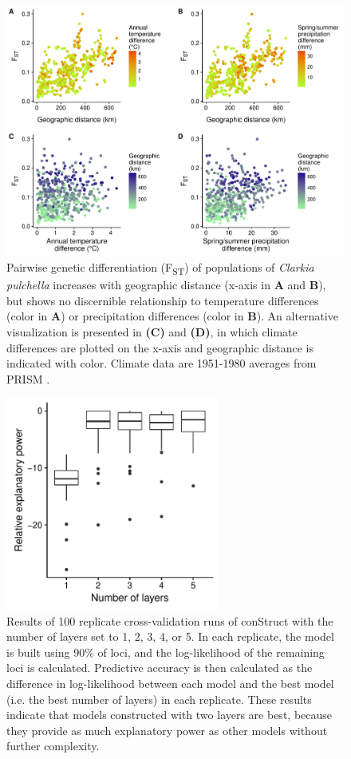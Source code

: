 \documentclass{article}
\begin{document}
\begin{figure}[p]
\centering
\includegraphics[width=\textwidth]{figs/fst_clim_dist.pdf}
\caption[Pairwise genetic differentiation vs. geographic distance]{Pairwise genetic differentiation (F\textsubscript{ST}) of populations of \textit{Clarkia pulchella} increases with geographic distance (x-axis in \textbf{A} and \textbf{B}), but shows no discernible relationship to temperature differences (color in \textbf{A}) or precipitation differences (color in \textbf{B}). An alternative visualization is presented in \textbf{(C)} and \textbf{(D)}, in which climate differences are plotted on the x-axis and geographic distance is indicated with color. Climate data are 1951-1980 averages from PRISM \citep{PRISM}.}
\label{fst_main_popgen}
\end{figure}

\begin{figure}[p]
\centering
\includegraphics[width=7cm]{figs/xval_results.pdf}
\caption[Results of conStruct cross validation]{Results of 100 replicate cross-validation runs of conStruct with the number of layers set to 1, 2, 3, 4, or 5. In each replicate, the model is built using 90\% of loci, and the log-likelihood of the remaining loci is calculated. Predictive accuracy is then calculated as the difference in log-likelihood between each model and the best model (i.e. the best number of layers) in each replicate. These results indicate that models constructed with two layers are best, because they provide as much explanatory power as other models without further complexity.}
\label{construct_xval}
\end{figure}
\end{document}
